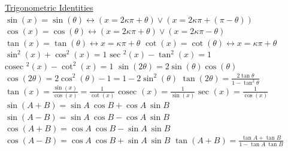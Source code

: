 \documentclass[12pt]{article}
\def\cosec{\text{cosec\ }} %
\def\sec{\text{sec\ }} %
\begin{document}
\begin{flushleft}
	\uline{Trigonometric Identities} \linebreak 
	\textbullet \quad $\displaystyle \sin (x) = \sin (\theta) \leftrightarrow (x = 2\kappa\pi + \theta) \lor (x = 2\kappa \pi + (\pi - \theta)) $ \linebreak 
	\textbullet \quad $\displaystyle \cos (x) = \cos (\theta) \leftrightarrow (x = 2\kappa \pi + \theta) \lor (x = 2\kappa \pi - \theta) $ \linebreak 
	\textbullet \quad $\displaystyle \tan (x) = \tan (\theta) \leftrightarrow x = \kappa \pi + \theta $ \linebreak 
	\textbullet \quad $\displaystyle \cot (x) = \cot (\theta) \leftrightarrow x = \kappa \pi + \theta $ \linebreak 
	\textbullet \quad $\displaystyle \sin ^2(x) + \cos ^2(x) = 1 $ \linebreak 
	\textbullet \quad $\displaystyle \sec ^2(x) -\tan ^2(x) = 1 $ \linebreak 
	\textbullet \quad $\displaystyle \cosec ^2(x) -\cot ^2(x) = 1 $ \linebreak 
	\textbullet \quad $\displaystyle \sin (2\theta) = 2\sin (\theta)\cos (\theta) $ \linebreak 
	\textbullet \quad $\displaystyle \cos (2\theta) = 2\cos ^2(\theta) - 1 = 1 - 2\sin ^2(\theta) $ \linebreak 
	\textbullet \quad $\displaystyle \tan (2\theta) = \frac{2\tan \theta}{1-\tan ^2\theta} $ \linebreak 
	\textbullet \quad $\displaystyle \tan (x) = \frac{\sin (x) }{\cos (x)} = \frac{1}{\cot (x)} $ \linebreak 
	\textbullet \quad $\displaystyle \cosec (x) = \frac{1}{\sin (x)} $ \linebreak 
	\textbullet \quad $\displaystyle \sec (x) = \frac{1}{\cos (x)} $ \linebreak 
	\textbullet \quad $\displaystyle \sin (A+ B) = \sin A \ \cos B + \cos A \ \sin B $ \linebreak 
	\textbullet \quad $\displaystyle \sin (A - B) = \sin A \ \cos B - \cos A \ \sin B $ \linebreak 
	\textbullet \quad $\displaystyle \cos (A + B) = \cos A \ \cos B - \sin A \ \sin B $ \linebreak 
	\textbullet \quad $\displaystyle \cos (A - B) = \cos A \ \cos B + \sin A \ \sin B $ \linebreak 
	\textbullet \quad $\displaystyle \tan (A + B) = \frac{\tan A + \tan B}{1 -\tan A \ \tan B} $ \linebreak 

\end{flushleft}
\end{document}
